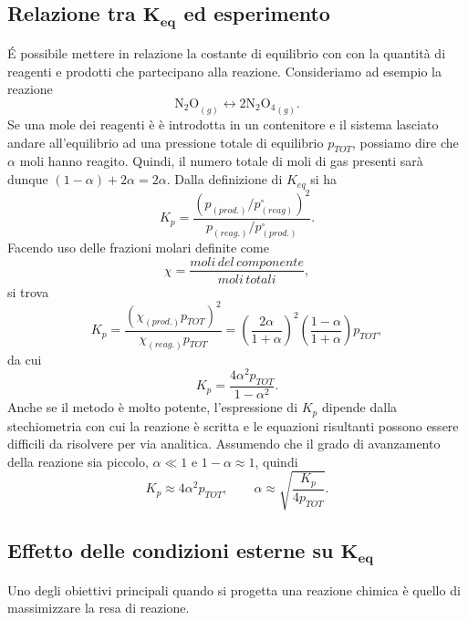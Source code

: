 \subsection{Relazione tra \texorpdfstring{$\bm{K_{eq}}$}{K} ed esperimento}
\'E possibile mettere in relazione la costante di equilibrio con con la quantità di reagenti e prodotti che partecipano alla reazione.
Consideriamo ad esempio la reazione 
\begin{equation}
    {\text{N}_2\text{O}}_{\left(g\right)}\longleftrightarrow{2\text{N}_2\text{O}_4}_{\left(g\right)}.
\end{equation}
Se una mole dei reagenti è è introdotta in un contenitore e il sistema lasciato andare all'equilibrio ad una pressione
totale di equilibrio $p_{TOT}$, possiamo dire che $\alpha$ moli hanno reagito. Quindi, il numero totale di moli di gas presenti sarà dunque $(1-\alpha)+2\alpha=2\alpha$. Dalla definizione di $K_{eq}$ si ha
\begin{equation}
    K_p=\frac{\left({{p_{(prod.)}}/{p_{(reag)}^\circ}}\right)^2}{{p_{(reag.)}}/{p_{(prod.)}^\circ}}.
\end{equation}
Facendo uso delle frazioni molari definite come
\begin{equation}
    \chi=\frac{moli\,del\,componente}{moli\,totali},
\end{equation}
si trova
\begin{equation}
    K_p=\frac{\left(\chi_{(prod.)}p_{TOT}\right)^2}{\chi_{(reag.)}p_{TOT}}=\left(\frac{2\alpha}{1+\alpha}\right)^2\left(\frac{1-\alpha}{1+\alpha}\right)p_{TOT},
\end{equation}
da cui
\begin{equation}
    K_p=\frac{4\alpha^2p_{TOT}}{1-\alpha^2}.
\end{equation}
Anche se il metodo è molto potente, l'espressione di $K_p$ dipende dalla stechiometria con cui la reazione è scritta e le equazioni risultanti possono essere difficili da risolvere per via analitica. Assumendo che il grado di avanzamento
della reazione sia piccolo, $\alpha\ll1$ e $1-\alpha\approx1$, quindi 
\begin{equation}
    K_p\approx4\alpha^2p_{TOT},\qquad\alpha\approx\sqrt{\frac{K_p}{4p_{TOT}}}.
\end{equation}

\subsection{Effetto delle condizioni esterne su \texorpdfstring{$\bm{K_{eq}}$}{K}}
Uno degli obiettivi principali quando si progetta una reazione chimica è quello di massimizzare la resa di
reazione.
